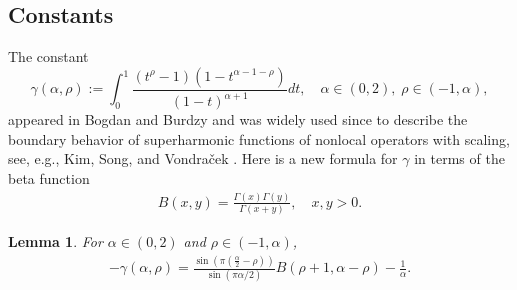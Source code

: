 \documentclass[12pt, a4paper]{amsart}
\newtheorem{lemma}[theorem]{Lemma}
\begin{document}
\subsection{Constants}
The constant 
\begin{equation}
\label{equation: gamma def}
\gamma(\alpha, \rho) := \int_{0}^{1}\frac{\left(t^{\rho}-1\right)\left(1-t^{\alpha-1-\rho}\right)}{\left(1-t\right)^{\alpha+1}}dt, \quad \alpha \in (0, 2), \; \rho \in (-1, \alpha),
\end{equation}
appeared in Bogdan and Burdzy \cite[(5.2)]{MR2006232} and was widely used since to describe the boundary behavior of superharmonic functions of nonlocal operators with scaling, see, e.g., Kim, Song, and Vondraček \cite{MR4886451}. Here is a new formula for $\gamma$ in terms of the beta function
\begin{align}
B(x, y) = \frac{\Gamma(x)\Gamma(y)}{\Gamma(x + y)}, \quad x, y > 0.
\end{align}
\begin{lemma}
\label{lemma: gamma laplasjan}
For $\alpha \in (0, 2)$ and $\rho \in (-1, \alpha)$, 
\begin{align}
\label{equation: gamma laplasjan}
-\gamma(\alpha, \rho) = \frac{\sin\left(\pi\left(\frac{\alpha}{2}-\rho\right)\right)}{\sin(\pi\alpha/2)}B\left(\rho+1,\alpha-\rho\right)-\frac{1}{\alpha}.
\end{align}
\end{lemma}
\end{document}
